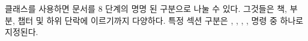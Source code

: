 \theclass{} 클래스를 사용하면 문서를 8 단계의 명명 된 구분으로 나눌 수 있다.
  그것들은 책, 부분, 챕터 및 하위 단락에 이르기까지 다양하다.
특정 섹션 구분은 \cmd{\book}, \cmd{\part}, \cmd{\chapter}, \cmd{\section}, \cmd{\subsection} 명령 중 하나로 지정된다.
